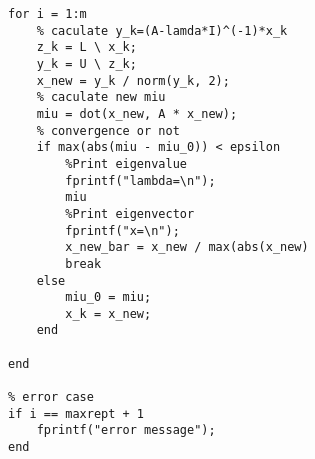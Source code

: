 \documentclass[12pt,a4paper,UTF8]{ctexart}
\begin{document}
\begin{enumerate}
\begin{lstlisting}[frame=single]
for i = 1:m
    % caculate y_k=(A-lamda*I)^(-1)*x_k
    z_k = L \ x_k;
    y_k = U \ z_k;
    x_new = y_k / norm(y_k, 2);
    % caculate new miu
    miu = dot(x_new, A * x_new);
    % convergence or not
    if max(abs(miu - miu_0)) < epsilon
        %Print eigenvalue
        fprintf("lambda=\n");
        miu
        %Print eigenvector
        fprintf("x=\n");
        x_new_bar = x_new / max(abs(x_new)
        break
    else
        miu_0 = miu;
        x_k = x_new;
    end

end

% error case
if i == maxrept + 1
    fprintf("error message");
end
          \end{lstlisting}
\end{enumerate}
\end{document}
